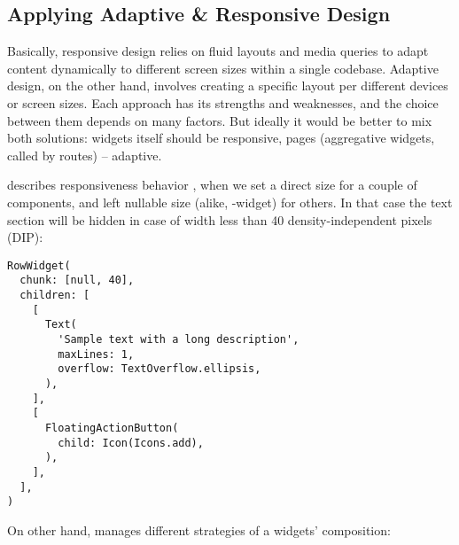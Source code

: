 
\subsection{Applying Adaptive \& Responsive Design}

Basically, responsive design relies on fluid layouts and media queries to adapt content dynamically to different screen 
sizes within a single codebase. Adaptive design, on the other hand, involves creating a specific layout per different 
devices or screen sizes. Each approach has its strengths and weaknesses, and the choice between them depends on many 
factors. But ideally it would be better to mix both solutions: widgets itself should be responsive, pages (aggregative 
widgets, called by routes) -- adaptive.

 describes responsiveness behavior ,  when we set a direct size 
for a couple of components, and left nullable size (alike, -widget) for others. In that case the text section 
will be hidden in case of width less than 40 density-independent pixels (DIP):

\begin{lstlisting}
RowWidget(
  chunk: [null, 40],
  children: [
    [
      Text(
        'Sample text with a long description', 
        maxLines: 1,
        overflow: TextOverflow.ellipsis,
      ),
    ],
    [
      FloatingActionButton(
        child: Icon(Icons.add),
      ),
    ],
  ],
)
\end{lstlisting}

\noindent On other hand,  manages  different strategies of a widgets' composition: 

